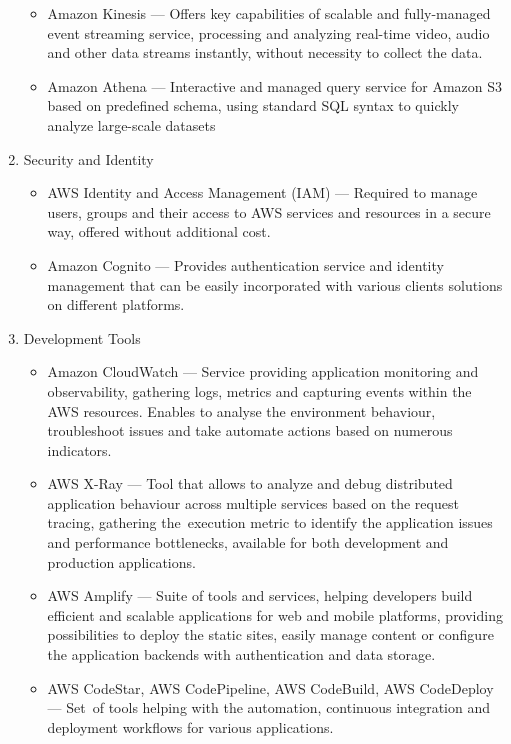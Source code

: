 \begin{enumerate}
   \begin{itemize}
       \item Amazon Kinesis --- Offers key capabilities of scalable and fully-managed event streaming service, processing and analyzing real-time video, audio and other data streams instantly, without necessity to collect the data.
       \item Amazon Athena --- Interactive and managed query service for Amazon S3 based on predefined schema, using standard SQL syntax to quickly analyze large-scale datasets
   \end{itemize}
   \item Security and Identity
   \begin{itemize}
       \item AWS Identity and Access Management (IAM) --- Required to manage users, groups and their access to AWS services and resources in a secure way, offered without additional cost.
       \item Amazon Cognito --- Provides authentication service and identity management that can be easily incorporated with various clients solutions on different platforms.
   \end{itemize}
   \item Development Tools
   \begin{itemize}
       \item Amazon CloudWatch --- Service providing application monitoring and observability, gathering logs, metrics and capturing events within the AWS resources. Enables to analyse the environment behaviour, troubleshoot issues and take automate actions based on numerous indicators.
       \item AWS X-Ray --- Tool that allows to analyze and debug distributed application behaviour across multiple services based on the request tracing, gathering the~execution metric to identify the application issues and performance bottlenecks, available for both development and production applications.
       \item AWS Amplify --- Suite of tools and services, helping developers build efficient and scalable applications for web and mobile platforms, providing possibilities to deploy the static sites, easily manage content or configure the application backends with authentication and data storage.
       \item AWS CodeStar, AWS CodePipeline, AWS CodeBuild, AWS CodeDeploy --- Set~of tools helping with the automation, continuous integration and deployment workflows for various applications.
   \end{itemize}
\end{enumerate}

